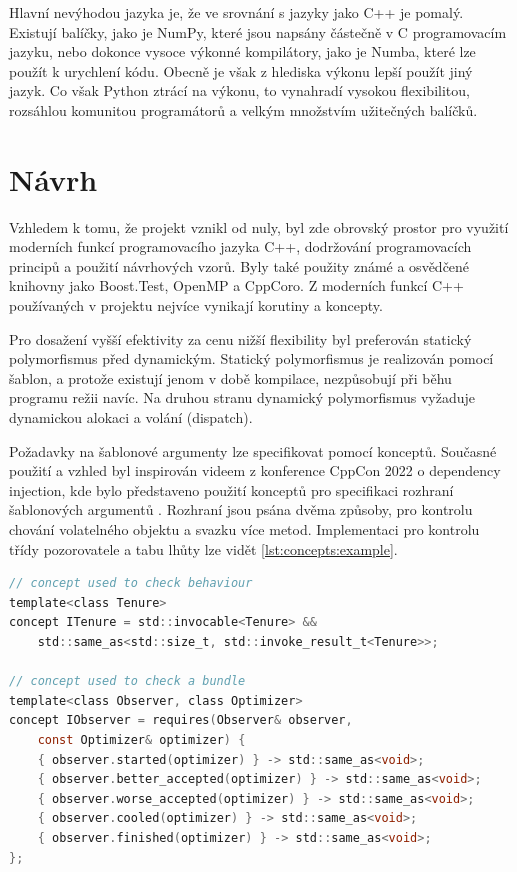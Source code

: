 Hlavní nevýhodou jazyka je, že ve srovnání s jazyky jako C++ je pomalý.
Existují balíčky, jako je NumPy, které jsou napsány částečně v C programovacím jazyku, nebo dokonce vysoce výkonné kompilátory, jako je Numba, které lze použít k urychlení kódu.
Obecně je však z hlediska výkonu lepší použít jiný jazyk.
Co však Python ztrácí na výkonu, to vynahradí vysokou flexibilitou, rozsáhlou komunitou programátorů a velkým množstvím užitečných balíčků.

\chapter{Návrh}
Vzhledem k tomu, že projekt vznikl od nuly, byl zde obrovský prostor pro využití moderních funkcí programovacího jazyka C++, dodržování programovacích principů a použití návrhových vzorů.
Byly také použity známé a osvědčené knihovny jako Boost.Test, OpenMP a CppCoro.
Z moderních funkcí C++ používaných v projektu nejvíce vynikají korutiny a koncepty.

Pro dosažení vyšší efektivity za cenu nižší flexibility byl preferován statický polymorfismus před dynamickým.
Statický polymorfismus je realizován pomocí šablon, a protože existují jenom v době kompilace, nezpůsobují při běhu programu režii navíc.
Na druhou stranu dynamický polymorfismus vyžaduje dynamickou alokaci a volání (dispatch).

Požadavky na šablonové argumenty lze specifikovat pomocí konceptů.
Současné použití a vzhled byl inspirován videem z konference CppCon 2022 o dependency injection, kde bylo představeno použití konceptů pro specifikaci rozhraní šablonových argumentů \cite{zoffoli}.
Rozhraní jsou psána dvěma způsoby, pro kontrolu chování volatelného objektu a svazku více metod.
Implementaci pro kontrolu třídy pozorovatele a tabu lhůty lze vidět \ref{lst:concepts:example}.

\begin{lstlisting}[caption={~Specifikace rozhraní pomocí konceptů},label={lst:concepts:example},captionpos=t,abovecaptionskip=-\medskipamount,belowcaptionskip=\medskipamount,language=C]
// concept used to check behaviour
template<class Tenure>
concept ITenure = std::invocable<Tenure> &&
    std::same_as<std::size_t, std::invoke_result_t<Tenure>>;

// concept used to check a bundle
template<class Observer, class Optimizer>
concept IObserver = requires(Observer& observer,
    const Optimizer& optimizer) {
    { observer.started(optimizer) } -> std::same_as<void>;
    { observer.better_accepted(optimizer) } -> std::same_as<void>;
    { observer.worse_accepted(optimizer) } -> std::same_as<void>;
    { observer.cooled(optimizer) } -> std::same_as<void>;
    { observer.finished(optimizer) } -> std::same_as<void>;
};
\end{lstlisting}

